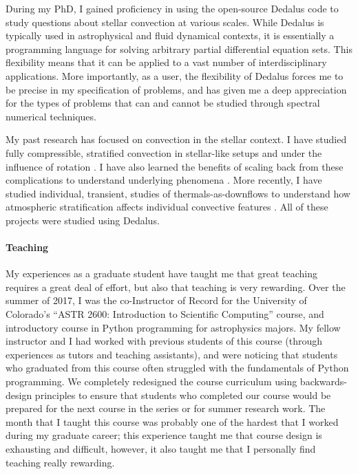 \documentclass[aps, pre, onecolumn, nofootinbib, notitlepage, groupedaddress, amsfonts, amssymb, amsmath]{revtex4-1}
\begin{document}
During my PhD, I gained proficiency in using the open-source Dedalus \citep{burns&all2019} code to study questions about stellar convection at various scales.
While Dedalus is typically used in astrophysical and fluid dynamical contexts, it is essentially a programming language for solving arbitrary partial differential equation sets.
This flexibility means that it can be applied to a vast number of interdisciplinary applications.
More importantly, as a user, the flexibility of Dedalus forces me to be precise in my specification of problems, and has given me a deep appreciation for the types of problems that can and cannot be studied through spectral numerical techniques.

My past research has focused on convection in the stellar context.
I have studied fully compressible, stratified convection in stellar-like setups and under the influence of rotation \citep{anders&brown2017, anders&all2019}.
I have also learned the benefits of scaling back from these complications to understand underlying phenomena \citep{anders&all2018}.
More recently, I have studied individual, transient, studies of thermals-as-downflows to understand how atmospheric stratification affects individual convective features \citep{andersLB2019}.
All of these projects were studied using Dedalus.

\paragraph*{Teaching}
My experiences as a graduate student have taught me that great teaching requires a great deal of effort, but also that teaching is very rewarding.
Over the summer of 2017, I was the co-Instructor of Record for the University of Colorado's ``ASTR 2600: Introduction to Scientific Computing'' course, and introductory course in Python programming for astrophysics majors.
My fellow instructor and I had worked with previous students of this course (through experiences as tutors and teaching assistants), and were noticing that students who graduated from this course often struggled with the fundamentals of Python programming.
We completely redesigned the course curriculum using backwards-design principles to ensure that students who completed our course would be prepared for the next course in the series or for summer research work.
The month that I taught this course was probably one of the hardest that I worked during my graduate career; this experience taught me that course design is exhausting and difficult, however, it also taught me that I personally find teaching really rewarding.
\end{document}
